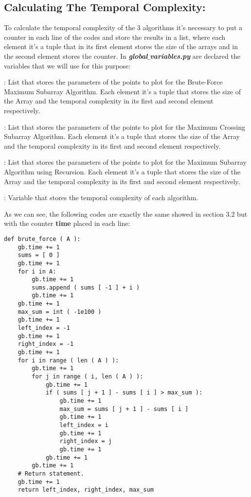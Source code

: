 \subsection{Calculating The Temporal Complexity:}

To calculate the temporal complexity of the 3 algorithms it's necessary to put a counter in each line of the codes and store the results in a list, where each element it's a tuple that in its first element stores the size of the arrays and in the second element stores the counter. In {\bfseries\itshape global$\_$variables.py} are declared the variables that we will use for this purpose: \hfill

\begin{tasks}
: List that stores the parameters of the points to plot for the Brute-Force Maximum Subarray Algorithm. Each element it's a tuple that stores the size of the Array and the temporal complexity in its first and second element respectively.

: List that stores the parameters of the points to plot for the Maximum Crossing Subarray Algorithm. Each element it's a tuple that stores the size of the Array and the temporal complexity in its first and second element respectively.

: List that stores the parameters of the points to plot for the Maximum Subarray Algorithm using Recursion. Each element it's a tuple that stores the size of the Array and the temporal complexity in its first and second element respectively.

: Variable that stores the temporal complexity of each algorithm.
\end{tasks} \hfill

As we can see, the following codes are exactly the same showed in section 3.2 but with the counter {\bfseries time} placed in each line: \hfill \break

\begin{lstlisting}
def brute_force ( A ):
    gb.time += 1
    sums = [ 0 ]
    gb.time += 1
    for i in A:
        gb.time += 1
        sums.append ( sums [ -1 ] + i )
        gb.time += 1
    gb.time += 1
    max_sum = int ( -1e100 )
    gb.time += 1
    left_index = -1
    gb.time += 1
    right_index = -1
    gb.time += 1
    for i in range ( len ( A ) ):
        gb.time += 1
        for j in range ( i, len ( A ) ):
            gb.time += 1
            if ( sums [ j + 1 ] - sums [ i ] > max_sum ):
                gb.time += 1
                max_sum = sums [ j + 1 ] - sums [ i ]
                gb.time += 1
                left_index = i
                gb.time += 1
                right_index = j
                gb.time += 1
            gb.time += 1
        gb.time += 1
    # Return statement.
    gb.time += 1
    return left_index, right_index, max_sum
\end{lstlisting} \hfill

